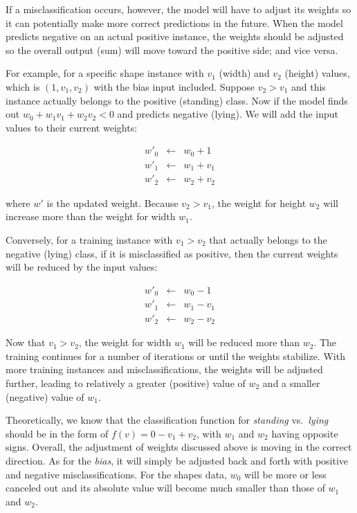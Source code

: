 \documentclass[
  letterpaper,
]{scrbook}
\begin{document}
If a misclassification occurs, however, the model will have to adjust
its weights so it can potentially make more correct predictions in the
future. When the model predicts negative on an actual positive instance,
the weights should be adjusted so the overall output (sum) will move
toward the positive side; and vice versa.

For example, for a specific shape instance with \(v_1\) (width) and
\(v_2\) (height) values, which is \((1, v_1, v_2)\) with the bias input
included. Suppose \(v_2>v_1\) and this instance actually belongs to the
positive (standing) class. Now if the model finds out
\(w_0 + w_1 v_1 + w_2 v_2 < 0\) and predicts negative (lying). We will
add the input values to their current weights:

\[\begin{aligned}
w'_0 & \gets & w_0 + 1 \\
w'_1 & \gets & w_1 + v_1 \\
w'_2 & \gets & w_2 + v_2
\end{aligned}\]

where \(w'\) is the updated weight. Because \(v_2>v_1\), the weight for
height \(w_2\) will increase more than the weight for width \(w_1\).

Conversely, for a training instance with \(v_1>v_2\) that actually
belongs to the negative (lying) class, if it is misclassified as
positive, then the current weights will be reduced by the input values:

\[\begin{aligned}
w'_0 & \gets & w_0 - 1 \\
w'_1 & \gets & w_1 - v_1 \\
w'_2 & \gets & w_2 - v_2
\end{aligned}\]

Now that \(v_1>v_2\), the weight for width \(w_1\) will be reduced more
than \(w_2\). The training continues for a number of iterations or until
the weights stabilize. With more training instances and
misclassifications, the weights will be adjusted further, leading to
relatively a greater (positive) value of \(w_2\) and a smaller
(negative) value of \(w_1\).

Theoretically, we know that the classification function for
\emph{standing} vs.~\emph{lying} should be in the form of
\(f(v) = 0 - v_1 + v_2\), with \(w_1\) and \(w_2\) having opposite
signs. Overall, the adjustment of weights discussed above is moving in
the correct direction. As for the \emph{bias}, it will simply be
adjusted back and forth with positive and negative misclassifications.
For the shapes data, \(w_0\) will be more or less canceled out and its
absolute value will become much smaller than those of \(w_1\) and
\(w_2\).
\end{document}
